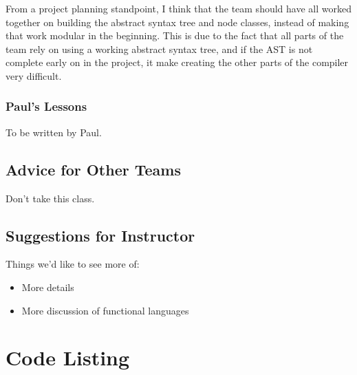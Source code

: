 \documentclass{book}
\begin{document}
From a project planning standpoint, I think that the team should have all worked 
together on building the abstract syntax tree and node classes, instead of making
that work modular in the beginning. This is due to the fact that all parts of the team
rely on using a working abstract syntax tree, and if the AST is not complete early on
in the project, it make creating the other parts of the compiler very difficult. 

\subsection{Paul's Lessons}
\label{sub:pauls-lessons}

To be written by Paul.

\section{Advice for Other Teams}

Don't take this class.

\section{Suggestions for Instructor}

Things we'd like to see more of:

\begin{itemize}
\item More details  
\item More discussion of functional languages
\end{itemize}

\appendix

\chapter{Code Listing}
\end{document}
